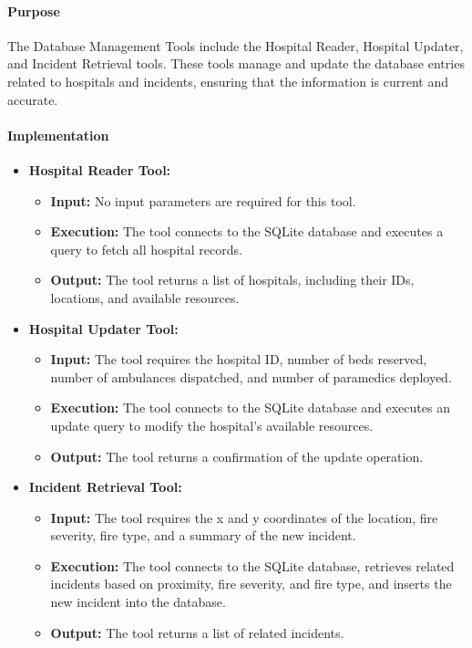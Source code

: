 \paragraph{Purpose}
The Database Management Tools include the Hospital Reader, Hospital Updater, and Incident Retrieval tools. These tools manage and update the database entries related to hospitals and incidents, ensuring that the information is current and accurate.

\paragraph{Implementation}
\begin{itemize}
    \item \textbf{Hospital Reader Tool:}
        \begin{itemize}
            \item \textbf{Input:} No input parameters are required for this tool.
            \item \textbf{Execution:} The tool connects to the SQLite \cite{sqlite} database and executes a query to fetch all hospital records.
            \item \textbf{Output:} The tool returns a list of hospitals, including their IDs, locations, and available resources.
        \end{itemize}
    \item \textbf{Hospital Updater Tool:}
        \begin{itemize}
            \item \textbf{Input:} The tool requires the hospital ID, number of beds reserved, number of ambulances dispatched, and number of paramedics deployed.
            \item \textbf{Execution:} The tool connects to the SQLite database and executes an update query to modify the hospital's available resources.
            \item \textbf{Output:} The tool returns a confirmation of the update operation.
        \end{itemize}
    \item \textbf{Incident Retrieval Tool:}
        \begin{itemize}
            \item \textbf{Input:} The tool requires the x and y coordinates of the location, fire severity, fire type, and a summary of the new incident.
            \item \textbf{Execution:} The tool connects to the SQLite database, retrieves related incidents based on proximity, fire severity, and fire type, and inserts the new incident into the database.
            \item \textbf{Output:} The tool returns a list of related incidents.
        \end{itemize}
\end{itemize}

